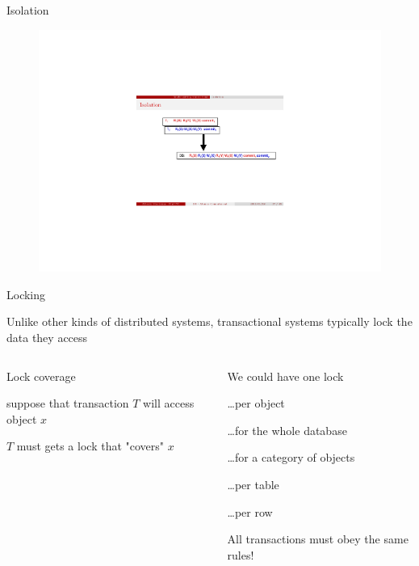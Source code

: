 \begin{frame}{Isolation}
\begin{overprint}
\begin{figure}
	\includegraphics[width=\textwidth,page=3]{fig4-isolation.pdf}
\end{figure}
\end{overprint}

\end{frame}

\begin{frame}{Locking}
	
Unlike other kinds of distributed systems, transactional systems typically lock the data they access

\bigskip
\begin{columns}[T]
\begin{column}{0.5\textwidth}
\BI
\item \alert{Lock coverage}
  \BI 
  \item suppose that transaction $T$ will access object $x$
  \item $T$ must gets a lock that "covers" $x$
  \EI
\EI
\end{column}
\begin{column}{0.5\textwidth}
\BI
\item We could have one lock   
  \BI
  \item \ldots per object
  \item \ldots for the whole database   
  \item \ldots for a category of objects   
  \item \ldots per table
  \item \ldots per row
  \EI
\item All transactions must obey the same rules!
\EI
\end{column}
\end{columns}

\end{frame}

